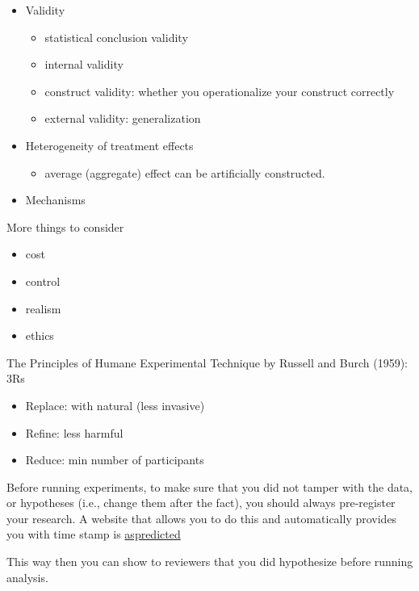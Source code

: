 \documentclass[
]{book}
\providecommand{\tightlist}{%
  \setlength{\itemsep}{0pt}\setlength{\parskip}{0pt}}
\begin{document}
\begin{itemize}
\item
  Validity

  \begin{itemize}
  \tightlist
  \item
    statistical conclusion validity
  \item
    internal validity
  \item
    construct validity: whether you operationalize your construct correctly
  \item
    external validity: generalization
  \end{itemize}
\item
  Heterogeneity of treatment effects

  \begin{itemize}
  \tightlist
  \item
    average (aggregate) effect can be artificially constructed.
  \end{itemize}
\item
  Mechanisms
\end{itemize}

More things to consider

\begin{itemize}
\tightlist
\item
  cost
\item
  control
\item
  realism
\item
  ethics
\end{itemize}

The Principles of Humane Experimental Technique by Russell and Burch (1959): 3Rs

\begin{itemize}
\tightlist
\item
  Replace: with natural (less invasive)
\item
  Refine: less harmful
\item
  Reduce: min number of participants
\end{itemize}

Before running experiments, to make sure that you did not tamper with the data, or hypotheses (i.e., change them after the fact), you should always pre-register your research. A website that allows you to do this and automatically provides you with time stamp is \href{https://aspredicted.org/}{aspredicted}

This way then you can show to reviewers that you did hypothesize before running analysis.
\end{document}
